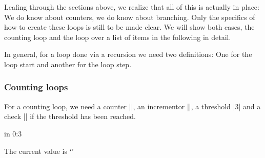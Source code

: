 Leafing through the sections above, we realize that all of this is actually in place: We do know about counters, we do know about branching. Only the specifics of how to create these loops is still to be made clear. We will show both cases, the counting loop and the loop over a list of items in the following in detail.

In general, for a loop done via a recursion we need two definitions: One for the loop start and another for the loop step.

\subsubsection{Counting loops}
\label{sec:counting:loops}
For a counting loop, we need a counter ||, an incrementor |\advance|, a threshold |3| and a check |\ifnum{}| if the threshold has been reached.


\begin{codeexample}[]
\long{}

\long{}
 in 0:{3}{%
	The current value is `\the{}'\par
}
\end{codeexample}

